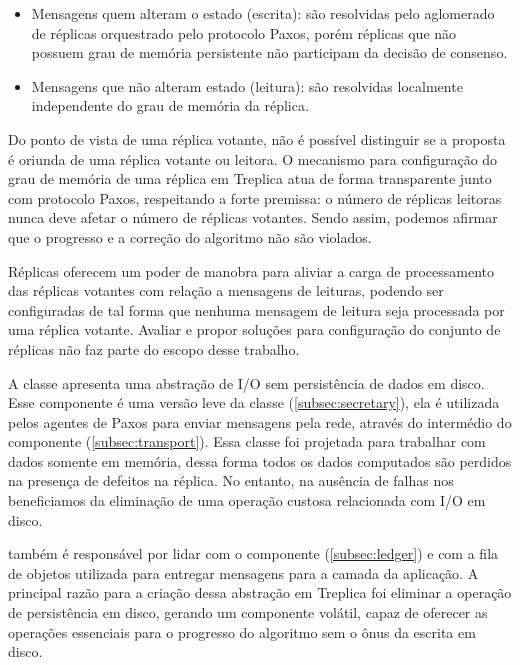 \begin{itemize}
  \item Mensagens quem alteram o estado (escrita): são resolvidas pelo aglomerado de
    réplicas orquestrado pelo protocolo Paxos, porém réplicas que não possuem grau de
    memória persistente não participam da decisão de consenso.
  \item Mensagens que não alteram estado (leitura): são resolvidas localmente independente
    do grau de memória da réplica.
\end{itemize}

Do ponto de vista de uma réplica votante, não é possível distinguir se a proposta é
oriunda de uma réplica votante ou leitora. O mecanismo para configuração do grau de
memória de uma réplica em Treplica atua de forma transparente junto com protocolo Paxos,
respeitando a forte premissa: o número de réplicas leitoras nunca deve afetar o número de
réplicas votantes. Sendo assim, podemos afirmar que o progresso e a correção do algoritmo
não são violados.

Réplicas oferecem um poder de manobra para aliviar a carga de processamento das réplicas
votantes com relação a mensagens de leituras, podendo ser configuradas de tal forma que
nenhuma mensagem de leitura seja processada por uma réplica votante. Avaliar e propor
soluções para configuração do conjunto de réplicas não faz parte do escopo desse trabalho.


A classe  apresenta uma abstração de I/O sem persistência de
dados em disco. Esse componente é uma versão leve da classe 
(\autoref{subsec:secretary}), ela é utilizada pelos agentes de Paxos para enviar mensagens
pela rede, através do intermédio do componente 
(\autoref{subsec:transport}). Essa classe foi projetada para trabalhar com dados somente
em memória, dessa forma todos os dados computados são perdidos na presença de defeitos na
réplica. No entanto, na ausência de falhas nos beneficiamos da eliminação de uma operação
custosa relacionada com I/O em disco.

 também é responsável por lidar com o componente
 (\autoref{subsec:ledger}) e com a fila de objetos utilizada
para entregar mensagens para a camada da aplicação. A principal razão para a criação dessa
abstração em Treplica foi eliminar a operação de persistência em disco, gerando um
componente volátil, capaz de oferecer as operações essenciais para o progresso do
algoritmo sem o ônus da escrita em disco.

